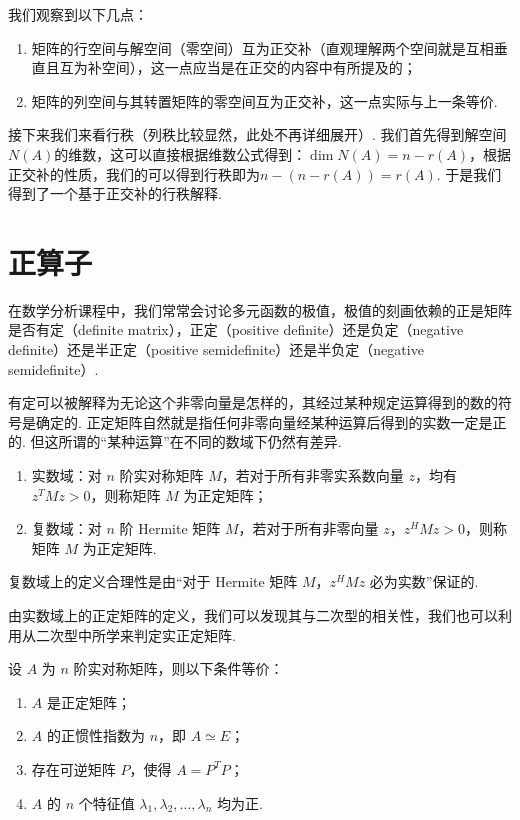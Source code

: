 我们观察到以下几点：
\begin{enumerate}
    \item 矩阵的行空间与解空间（零空间）互为正交补（直观理解两个空间就是互相垂直且互为补空间），这一点应当是在正交的内容中有所提及的；

    \item 矩阵的列空间与其转置矩阵的零空间互为正交补，这一点实际与上一条等价.
\end{enumerate}

接下来我们来看行秩（列秩比较显然，此处不再详细展开）. 我们首先得到解空间$N(A)$的维数，这可以直接根据维数公式得到：$\dim N(A) = n-r(A)$，根据正交补的性质，我们的可以得到行秩即为$n-(n-r(A))=r(A)$. 于是我们得到了一个基于正交补的行秩解释.

\section{正算子}

在数学分析课程中，我们常常会讨论多元函数的极值，极值的刻画依赖的正是矩阵是否有定（definite matrix），正定（positive definite）还是负定（negative definite）还是半正定（positive semidefinite）还是半负定（negative semidefinite）.

有定可以被解释为无论这个非零向量是怎样的，其经过某种规定运算得到的数的符号是确定的. 正定矩阵自然就是指任何非零向量经某种运算后得到的实数一定是正的. 但这所谓的``某种运算''在不同的数域下仍然有差异.

\begin{definition}[正定矩阵] 
    \begin{enumerate}
        \item 实数域：对 $ n $ 阶实对称矩阵 $ M $，若对于所有非零实系数向量 $ z $，均有$ z^{T}Mz > 0 $，则称矩阵 $ M $ 为正定矩阵；

        \item 复数域：对 $ n $ 阶 Hermite 矩阵 $ M $，若对于所有非零向量 $ z $，$ z^{H}Mz > 0 $，则称矩阵 $ M $ 为正定矩阵.
    \end{enumerate}
\end{definition}

复数域上的定义合理性是由``对于 Hermite 矩阵 $ M $，$ z^{H}Mz $ 必为实数''保证的.

由实数域上的正定矩阵的定义，我们可以发现其与二次型的相关性，我们也可以利用从二次型中所学来判定实正定矩阵.

\begin{theorem}
    设 $ A $ 为 $ n $ 阶实对称矩阵，则以下条件等价：
    \begin{enumerate}
        \item $ A $ 是正定矩阵；

        \item $ A $ 的正惯性指数为 $ n $，即 $ A \simeq E $；

        \item 存在可逆矩阵 $ P $，使得 $ A = P^{T}P $；

        \item $ A $ 的 $ n $ 个特征值 $ \lambda_1, \lambda_2, \ldots, \lambda_n $ 均为正.
    \end{enumerate}
\end{theorem}

